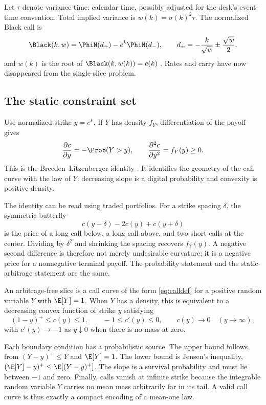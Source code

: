 Let $\tau$ denote variance time: calendar time, possibly adjusted for the
desk's event-time convention.  Total implied variance is
$w(k)=\sigma(k)^2\tau$.  The normalized Black call is
\begin{equation}
\Black(k,w)=\PhiN(d_+)-e^k\PhiN(d_-),
\qquad d_\pm=-\frac{k}{\sqrt w}\pm\frac{\sqrt w}{2},
\label{eq:black}
\end{equation}
and $w(k)$ is the root of $\Black(k,w(k))=c(k)$
\citep{Black1976}.  Rates and carry have now disappeared from the single-slice
problem.

\subsection{The static constraint set}

Use normalized strike $y=e^k$.  If $Y$ has density $f_Y$, differentiation of
the payoff gives
\begin{equation}
\frac{\partial c}{\partial y}=-\Prob(Y>y),
\qquad
\frac{\partial^2c}{\partial y^2}=f_Y(y)\ge0.
\label{eq:BL}
\end{equation}
This is the Breeden--Litzenberger identity
\citep{BreedenLitzenberger1978}.  It identifies the geometry of the call curve
with the law of $Y$: decreasing slope is a digital probability and convexity
is positive density.

The identity can be read using traded portfolios.  For a strike spacing
$\delta$, the symmetric butterfly
\[
c(y-\delta)-2c(y)+c(y+\delta)
\]
is the price of a long call below, a long call above, and two short calls at
the center.  Dividing by $\delta^2$ and shrinking the spacing recovers
$f_Y(y)$.  A negative second difference is therefore not merely undesirable
curvature; it is a negative price for a nonnegative terminal payoff.  The
probability statement and the static-arbitrage statement are the same.

\begin{definition}
\label{def:slice}
An arbitrage-free slice is a call curve of the form \eqref{eq:calldef} for a
positive random variable $Y$ with $\E[Y]=1$.  When $Y$ has a density, this is
equivalent to a decreasing convex function of strike $y$ satisfying
\[
(1-y)^+\le c(y)\le1,\qquad -1\le c'(y)\le0,\qquad
c(y)\longrightarrow0\quad(y\to\infty),
\]
with $c'(y)\to-1$ as $y\downarrow0$ when there is no mass at zero.
\end{definition}

Each boundary condition has a probabilistic source.  The upper bound follows
from $(Y-y)^+\le Y$ and $\E[Y]=1$.  The lower bound is Jensen's inequality,
$(\E[Y]-y)^+\le\E[(Y-y)^+]$.  The slope is a survival probability and must
lie between $-1$ and zero.  Finally, calls vanish at infinite strike because
the integrable random variable $Y$ carries no mean mass arbitrarily far in
its tail.  A valid call curve is thus exactly a compact encoding of a
mean-one law.

